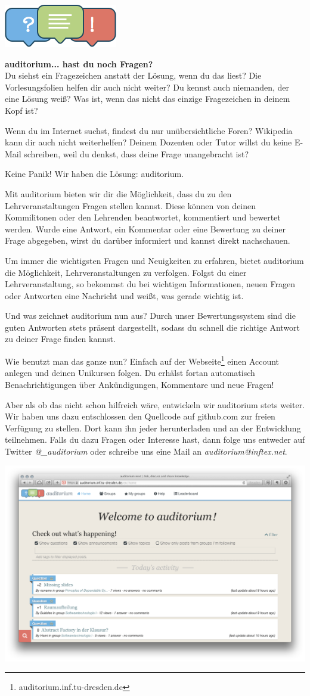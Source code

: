
\includegraphics{img/auditorium_logo}

\textbf{auditorium... hast du noch Fragen?} \\
Du siehst ein Fragezeichen anstatt der Lösung, wenn du das liest?
Die Vorlesungsfolien helfen dir auch nicht weiter? Du kennst auch niemanden, der eine Lösung weiß?
Was ist, wenn das nicht das einzige Fragezeichen in deinem Kopf ist?

Wenn du im Internet suchst, findest du nur unübersichtliche Foren?
Wikipedia kann dir auch nicht weiterhelfen?
Deinem Dozenten oder Tutor willst du keine E-Mail schreiben, weil du denkst, dass deine Frage unangebracht ist?

Keine Panik!
Wir haben die Lösung: auditorium.

Mit auditorium bieten wir dir die Möglichkeit, dass du zu den Lehrveranstaltungen Fragen stellen kannst.
Diese können von deinen Kommilitonen oder den Lehrenden beantwortet, kommentiert und bewertet werden.
Wurde eine Antwort, ein Kommentar oder eine Bewertung zu deiner Frage abgegeben, wirst du darüber informiert und kannst direkt nachschauen.

Um immer die wichtigsten Fragen und Neuigkeiten zu erfahren, bietet auditorium die Möglichkeit, Lehrveranstaltungen zu verfolgen.
Folgst du einer Lehrveranstaltung, so bekommst du bei wichtigen Informationen, neuen Fragen oder Antworten eine Nachricht und weißt, was gerade wichtig ist.

Und was zeichnet auditorium nun aus?
Durch unser Bewertungssystem sind die guten Antworten stets präsent dargestellt, sodass du schnell die richtige Antwort zu deiner Frage finden kannst.

Wie benutzt man das ganze nun?
Einfach auf der Webseite\footnote{auditorium.inf.tu-dresden.de} einen Account anlegen und deinen Unikursen folgen.
Du erhälst fortan automatisch Benachrichtigungen über Ankündigungen, Kommentare und neue Fragen!

Aber als ob das nicht schon hilfreich wäre, entwickeln wir auditorium stets weiter.
Wir haben uns dazu entschlossen den Quellcode auf github.com zur freien Verfügung zu stellen.
Dort kann ihn jeder herunterladen und an der Entwicklung teilnehmen.
Falls du dazu Fragen oder Interesse hast, dann folge uns entweder auf Twitter \textit{@\_auditorium} oder schreibe uns eine Mail an \textit{auditorium@inftex.net}.

\includegraphics[width=\linewidth]{img/auditorium.png}
